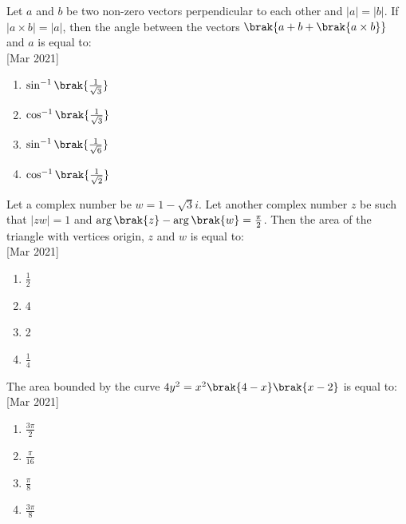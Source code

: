     \item{
        	Let $a$ and $b$ be two non-zero vectors perpendicular to each other and $|a| = |b|$. If $|a \times b| = |a|$, then the angle between the vectors $\brak{a + b + \brak{a \times b}}$ and $a$ is equal to:\\
             \text{   }\hfill
                {[Mar 2021]}
				\begin{multicols}{4}
	                \begin{enumerate}
	                   	\item $\sin^{-1}\brak{\frac{1}{\sqrt{3}}}$
	                   	\item $\cos^{-1}\brak{\frac{1}{\sqrt{3}}}$
	                   	\item $\sin^{-1}\brak{\frac{1}{\sqrt{6}}}$
	                   	\item $\cos^{-1}\brak{\frac{1}{\sqrt{2}}}$
	                \end{enumerate}
				\end{multicols}
        
        }
    \item{
	
			Let a complex number be $w = 1 - \sqrt{3}i$. Let another complex number $z$ be such that $|zw| = 1$ and $\arg\brak{z} - \arg\brak{w} = \frac{\pi}{2}$. Then the area of the triangle with vertices origin, $z$ and $w$ is equal to:\\
			\text{   }\hfill
			{[Mar 2021]}
			\begin{multicols}{4}
				\begin{enumerate}
						\item $\frac{1}{2}$
						\item 4
						\item 2
						\item $\frac{1}{4}$
				\end{enumerate}
			\end{multicols}
			
		}
    \item{
	
			The area bounded by the curve $4y^2 = x^2 \brak{4 - x}\brak{x - 2}$ is equal to:\\
			\text{   }\hfill
			{[Mar 2021]}
			\begin{multicols}{4}
				\begin{enumerate}
					\item $\frac{3\pi}{2}$
					\item $\frac{\pi}{16}$
					\item $\frac{\pi}{8}$
					\item $\frac{3\pi}{8}$
				\end{enumerate}
			\end{multicols}
			
		}

